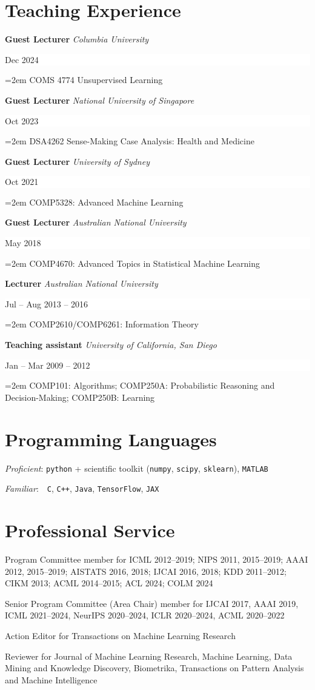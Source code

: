 \documentclass{article}
\newcommand{\NewPart}[1]{\section*{#1}}
\newcommand{\EducationEntry}[4]{
    \noindent \textbf{#1}
    \textit{#3}
    \hfill      %
    \colorbox{White}{
      \parbox{9em}{
      \hfill\color{Black}#2}} \par  %
    \noindent\hangindent=2em\hangafter=0 \small #4 %
    \normalsize \par}
\newcommand{\WorkEntry}[4]{       %
    \noindent
    \textbf{#1}
    \textit{#3} %
    \hfill      %
    \colorbox{White}{%
      \parbox{9em}{%
      \hfill\color{Black}#2}} \par   %
    \noindent\hangindent=2em\hangafter=0 \small #4 %
    \normalsize \par}
\begin{document}
\NewPart{Teaching Experience}{}

\WorkEntry
{Guest Lecturer}
{Dec 2024}
{Columbia University}
{
    COMS 4774  Unsupervised Learning
}

\WorkEntry
{Guest Lecturer}
{Oct 2023}
{National University of Singapore}
{
    DSA4262 Sense-Making Case Analysis: Health and Medicine
}

\WorkEntry
{Guest Lecturer}
{Oct 2021}
{University of Sydney}
{
    COMP5328: Advanced Machine Learning
}

\WorkEntry
{Guest Lecturer}
{May 2018}
{Australian National University}
{
    COMP4670: Advanced Topics in Statistical Machine Learning
}

\WorkEntry
{Lecturer}
{Jul -- Aug 2013 -- 2016}
{Australian National University}
{
    COMP2610/COMP6261: Information Theory
}

\WorkEntry
{Teaching assistant}
{Jan -- Mar 2009 -- 2012}
{University of California, San Diego}
{
    COMP101: Algorithms; COMP250A: Probabilistic Reasoning and Decision-Making; COMP250B: Learning
}

\NewPart{Programming Languages}{}

\emph{Proficient}: {{\tt python} + scientific toolkit ({\tt numpy}, {\tt scipy}, {\tt sklearn})},
{{\tt MATLAB}}

\noindent\emph{Familiar}: \,\ {\tt C}, {\tt C++}, {\tt Java},
{{\tt TensorFlow}},
{{\tt JAX}}


\NewPart{Professional Service}{}

\noindent
Program Committee member for 
ICML 2012--2019; 
NIPS 2011, 2015--2019; 
AAAI 2012, 2015--2019; 
AISTATS 2016, 2018;
IJCAI 2016, 2018; 
KDD 2011--2012; 
CIKM 2013; 
ACML 2014--2015;
ACL 2024;
COLM 2024

\medskip

\noindent
Senior Program Committee (Area Chair) member for 
IJCAI 2017, 
AAAI 2019, 
ICML 2021--2024, 
NeurIPS 2020--2024, 
ICLR 2020--2024, 
ACML 2020--2022

\medskip

\noindent
Action Editor for Transactions on Machine Learning Research

\medskip

\noindent
Reviewer for Journal of Machine Learning Research, Machine Learning, Data Mining and Knowledge Discovery, Biometrika, Transactions on Pattern Analysis and Machine Intelligence
\end{document}
